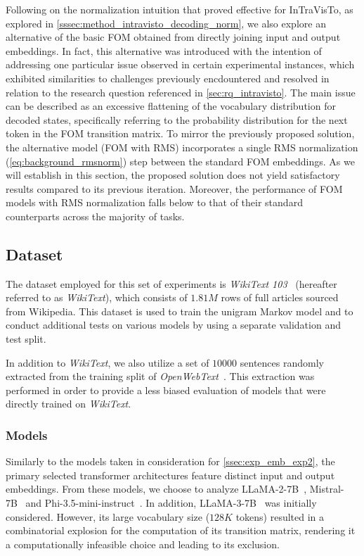 Following on the normalization intuition that proved effective for InTraVisTo, as explored in \cref{sssec:method_intravisto_decoding_norm}, we also explore an alternative of the basic FOM obtained from directly joining input and output embeddings.
In fact, this alternative was introduced with the intention of addressing one particular issue observed in certain experimental instances, which exhibited similarities to challenges previously encdountered and resolved in relation to the research question referenced in \cref{sec:rq_intravisto}.
The main issue can be described as an excessive flattening of the vocabulary distribution for decoded states, specifically referring to the probability distribution for the next token in the FOM transition matrix.
To mirror the previously proposed solution, the alternative model (FOM with RMS) incorporates a single RMS normalization (\cref{eq:background_rmsnorm}) step between the standard FOM embeddings.
As we will establish in this section, the proposed solution does not yield satisfactory results compared to its previous iteration.
Moreover, the performance of FOM models with RMS normalization falls below to that of their standard counterparts across the majority of tasks.

\subsection{Dataset}\label{ssec:exp_fom_dataset}

The dataset employed for this set of experiments is \emph{WikiText 103}~\cite{merity2017} (hereafter referred to as \emph{WikiText}), which consists of $1.81M$ rows of full articles sourced from Wikipedia.
This dataset is used to train the unigram Markov model and to conduct additional tests on various models by using a separate validation and test split.

In addition to \emph{WikiText}, we also utilize a set of $10000$ sentences randomly extracted from the training split of \emph{OpenWebText}~\cite{gokaslan2019}.
This extraction was performed in order to provide a less biased evaluation of models that were directly trained on \emph{WikiText}.

\subsubsection{Models}

Similarly to the models taken in consideration for \cref{ssec:exp_emb_exp2}, the primary selected transformer architectures feature distinct input and output embeddings.
From these models, we choose to analyze LLaMA-2-7B~\cite{touvron2023}, Mistral-7B~\cite{jiang2023} and Phi-3.5-mini-instruct~\cite{abdin2024}.
In addition, LLaMA-3-7B~\cite{dubey2024} was initially considered.
However, its large vocabulary size ($128K$ tokens) resulted in a combinatorial explosion for the computation of its transition matrix, rendering it a computationally infeasible choice and leading to its exclusion.

